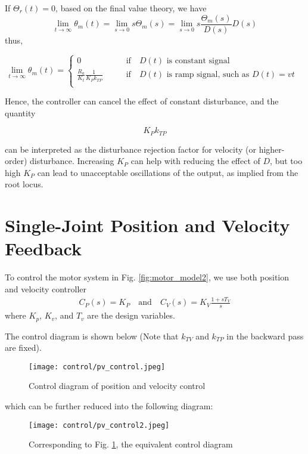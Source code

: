 \documentclass[10pt]{article}
\begin{document}
If $\Theta_r(t)=0$, based on the final value theory, we have
\begin{equation}
    \lim_{t\rightarrow \infty} {\theta_{m}(t)}= \lim_{s\rightarrow 0} s{\Theta_{m}(s)}=\lim_{s\rightarrow 0} s\frac{\Theta_{m}(s)}{D(s)}{D(s)}
\end{equation}
thus,

\begin{equation}
    \lim_{t\rightarrow \infty} {\theta_{m}(t)}= 
    \begin{cases}
        0\qquad &\text{if}\quad D(t)\,\,\text{is constant signal}\\
        \frac{R_a}{K_t}\frac{1}{K_{P} k_{T P}} \qquad &\text{if}\quad D(t)\,\,\text{is ramp signal, such as $D(t)=vt$ }\\
    \end{cases}
\end{equation}

Hence, the controller can cancel the effect of constant disturbance, and the quantity

$$
K_{P} k_{T P}
$$

can be interpreted as the disturbance rejection factor for velocity (or higher-order) disturbance. Increasing  $K_{P}$ can help with reducing the effect of $D$, but too high $K_P$ can lead to unacceptable oscillations of the output, as implied from the root locus.

\section{Single-Joint Position and Velocity Feedback}
To control the motor system in Fig. \ref{fig:motor_model2},  we  use both  position and velocity controller
$$
\begin{gathered}
C_{P}(s)=K_{P} \quad \text{and} \quad C_{V}(s)=K_{V} \frac{1+s T_{V}}{s} 
\end{gathered}
$$
where $K_p$, $K_v$, and $T_v$ are the design variables.


The control diagram is shown below (Note that $k_{TV}$ and $k_{TP}$ in the backward pass are fixed).

\begin{figure}[H]
    \centering
    \texttt{[image: control/pv\_control.jpeg]}
    \caption{Control diagram of position and velocity control}
    \label{fig.pv_control}
\end{figure}

which can be further reduced into the following diagram:
\begin{figure}[H]
    \centering
    \texttt{[image: control/pv\_control2.jpeg]}
    \caption{Corresponding to Fig. \ref{fig.pv_control}, the equivalent control diagram}
    \label{fig.pv_control2}
\end{figure}
\end{document}
